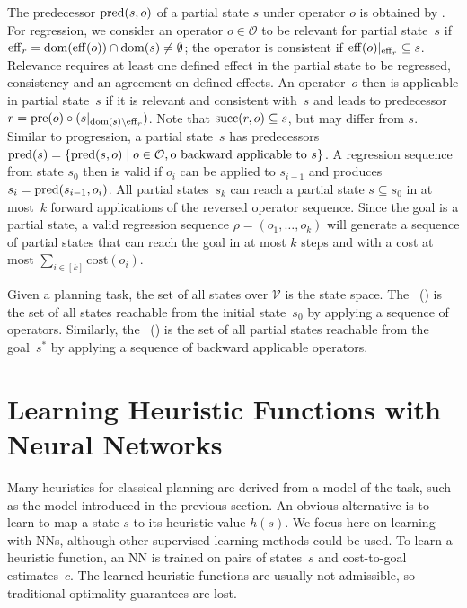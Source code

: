 The predecessor $\operatorname{pred}(s,o)$ of a partial state $s$ under operator $o$ is obtained by . For regression, we consider an operator $o\in \mathcal{O}$ to be relevant for partial state~$s$ if $\operatorname{eff}_r=\operatorname{dom}(\operatorname{eff}(o))\cap\operatorname{dom}(s)\neq\emptyset$; the operator is consistent if $\operatorname{eff}(o)|_{\operatorname{eff}_r} \subseteq s$. Relevance requires at least one defined effect in the partial state to be regressed, consistency and an agreement on defined effects. An operator~$o$ then is  applicable in partial state~$s$ if it is relevant and consistent with~$s$ and leads to predecessor $r=\operatorname{pre}(o)\circ (s|_{\operatorname{dom}(s)\setminus\operatorname{eff}_r})$. Note that $\operatorname{succ}(r,o)\subseteq s$, but may differ from $s$. Similar to progression, a partial state~$s$ has predecessors $\operatorname{pred}(s)=\{\operatorname{pred}(s,o)\mid o\in \mathcal{O}, \text{o backward applicable to }s\}$. A regression sequence from state $s_0$
then is valid if $o_i$ can be applied to $s_{i-1}$ and produces $s_i=\operatorname{pred}(s_{i-1},o_i)$. All partial states~$s_k$ can reach a partial state $s\subseteq s_0$ in at most~$k$ forward applications of the reversed operator sequence. Since the goal is a partial state, a valid regression sequence $\rho=(o_1,\ldots,o_k)$ will generate a sequence of partial states that can reach the goal in at most $k$ steps and with a cost at most $\sum_{i\in[k]}\text{cost}(o_i)$.

Given a planning task, the set of all states over $\mathcal{V}$ is the state space. The ~(\fssp) is the set of all states reachable from the initial state~$s_0$ by applying a sequence of operators. Similarly, the ~(\bssp) is the set of all partial states reachable from the goal~$s^*$ by applying a sequence of backward applicable operators. 

\section{Learning Heuristic Functions with Neural Networks}
\label{sec:learning}

Many heuristics for classical planning are derived from a model of the task, such as the \sas model introduced in the previous section. An obvious alternative is to learn to map a state $s$ to its heuristic value $h(s)$. We focus here on learning with NNs, although other supervised learning methods could be used. To learn a heuristic function, an NN is trained on pairs of states~$s$ and cost-to-goal estimates~$c$. The learned heuristic functions are usually not admissible, so traditional optimality guarantees are lost.

